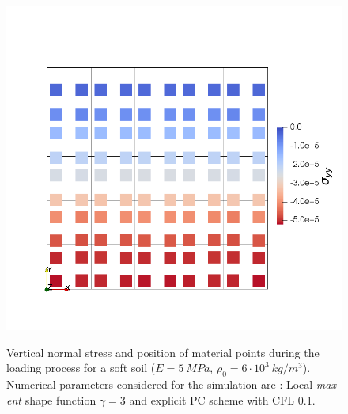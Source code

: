 \begin{figure}
{    \includegraphics[width=0.8\columnwidth]{Figures/Block_LME3_PCE_t1}
    \label{fig:Block-LME3-PCE-t1}
  }
  \caption{Vertical normal stress and position of material points
    during the loading process for a soft soil ($E = 5\ MPa$, $\rho_0
    = 6\cdot 10^3\ kg/m^3$). Numerical parameters considered for the
    simulation are : Local \textit{max-ent} shape function $\gamma =3$
    and explicit PC scheme with CFL 0.1.}
  \label{fig:Block-LME3}
\end{figure}







